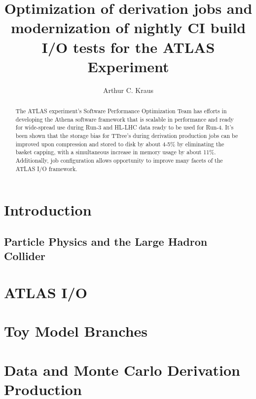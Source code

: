 \documentclass[12pt]{niuthesis}
\title{Optimization of derivation jobs and modernization of nightly CI build I/O tests for the ATLAS Experiment}
\author{Arthur C. Kraus}
\begin{document}
\begin{abstract}
The ATLAS experiment's Software Performance Optimization Team has efforts in developing the Athena software framework that is scalable in performance and ready for wide-spread use during Run-3 and HL-LHC data ready to be used for Run-4. It's been shown that the storage bias for TTree's during derivation production jobs can be improved upon compression and stored to disk by about 4-5\% by eliminating the basket capping, with a simultaneous increase in memory usage by about 11\%. Additionally, job configuration allows opportunity to improve many facets of the ATLAS I/O framework. 
\end{abstract}

\begin{dedication}

\end{dedication}

\begin{acknowledgements}

\end{acknowledgements}
\MakeThesisPrologue




\chapter{Introduction}
\section{Particle Physics and the Large Hadron Collider}


\chapter{ATLAS I/O}


\chapter{Toy Model Branches}


\chapter{Data and Monte Carlo Derivation Production}

\end{document}
